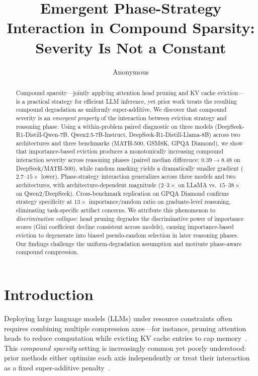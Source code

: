 \documentclass[11pt,a4paper]{article}
\title{Emergent Phase-Strategy Interaction in Compound Sparsity:\\Severity Is Not a Constant}
\author{Anonymous}
\begin{document}
\maketitle

\begin{abstract}
Compound sparsity---jointly applying attention head pruning and KV cache eviction---is a practical strategy for efficient LLM inference, yet prior work treats the resulting compound degradation as uniformly super-additive.
We discover that compound severity is an \emph{emergent property} of the interaction between eviction strategy and reasoning phase.
Using a within-problem paired diagnostic on three models (DeepSeek-R1-Distill-Qwen-7B, Qwen2.5-7B-Instruct, DeepSeek-R1-Distill-Llama-8B) across two architectures and three benchmarks (MATH-500, GSM8K, GPQA Diamond), we show that importance-based eviction produces a monotonically increasing compound interaction severity across reasoning phases (paired median difference: $0.39 \!\to\! 8.48$ on DeepSeek/MATH-500), while random masking yields a dramatically smaller gradient ($2.7$--$15\times$ lower).
Phase-strategy interaction generalizes across three models and two architectures, with architecture-dependent magnitude ($2$--$3\times$ on LLaMA vs.\ $15$--$38\times$ on Qwen2/DeepSeek).
Cross-benchmark replication on GPQA Diamond confirms strategy specificity at $13\times$ importance/random ratio on graduate-level reasoning, eliminating task-specific artifact concerns.
We attribute this phenomenon to \emph{discrimination collapse}: head pruning degrades the discriminative power of importance scores (Gini coefficient decline consistent across models), causing importance-based eviction to degenerate into biased pseudo-random selection in later reasoning phases.
Our findings challenge the uniform-degradation assumption and motivate phase-aware compound compression.
\end{abstract}

\section{Introduction}
\label{sec:intro}

Deploying large language models (LLMs) under resource constraints often requires combining multiple compression axes---for instance, pruning attention heads to reduce computation while evicting KV cache entries to cap memory~\citep{spark2024,slim2024}.
This \emph{compound sparsity} setting is increasingly common yet poorly understood: prior methods either optimize each axis independently or treat their interaction as a fixed super-additive penalty~\citep{spark2024,adakv2024}.
\end{document}
